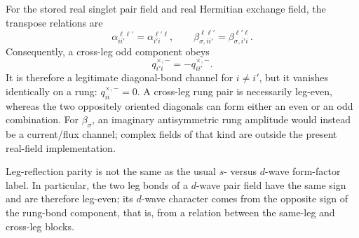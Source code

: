 \documentclass[11pt]{article}
\begin{document}
For the stored real singlet pair field and real Hermitian exchange field, the
transpose relations are
\begin{equation}
 \alpha_{ii'}^{\ell\ell'}=\alpha_{i'i}^{\ell'\ell},
 \qquad
 \beta_{\sigma,ii'}^{\ell\ell'}=\beta_{\sigma,i'i}^{\ell'\ell}.
 \label{eq:bond-transpose-symmetry}
\end{equation}
Consequently, a cross-leg odd component obeys
\begin{equation}
 q^{\times,-}_{i'i}=-q^{\times,-}_{ii'}.
 \label{eq:cross-leg-odd-reversal}
\end{equation}
It is therefore a legitimate diagonal-bond channel for \(i\ne i'\), but it
vanishes identically on a rung: \(q^{\times,-}_{ii}=0\).  A cross-leg rung pair
is necessarily leg-even, whereas the two oppositely oriented diagonals can form
either an even or an odd combination.  For \(\beta_\sigma\), an imaginary
antisymmetric rung amplitude would instead be a current/flux channel; complex
fields of that kind are outside the present real-field implementation.

Leg-reflection parity is not the same as the usual \(s\)- versus \(d\)-wave
form-factor label.  In particular, the two leg bonds of a \(d\)-wave pair field
have the same sign and are therefore leg-even; its \(d\)-wave character comes
from the opposite sign of the rung-bond component, that is, from a relation
between the same-leg and cross-leg blocks.
\end{document}
